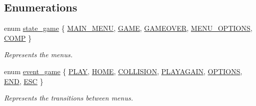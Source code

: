 \subsection*{Enumerations}
\begin{DoxyCompactItemize}
\item 
enum \hyperlink{group___state_machine_ga923762042f3074402fbf32bc96074164}{state\+\_\+game} \{ \newline
\hyperlink{group___state_machine_gga923762042f3074402fbf32bc96074164ac22743f1fc74de09544ecc9bab74a17b}{M\+A\+I\+N\+\_\+\+M\+E\+NU}, 
\hyperlink{group___state_machine_gga923762042f3074402fbf32bc96074164ad50cf309d7568040619ed26ee6835a84}{G\+A\+ME}, 
\hyperlink{group___state_machine_gga923762042f3074402fbf32bc96074164a42495cc178524da331d4681864c72b72}{G\+A\+M\+E\+O\+V\+ER}, 
\hyperlink{group___state_machine_gga923762042f3074402fbf32bc96074164a47392826c80116f57ab66b2132424dbf}{M\+E\+N\+U\+\_\+\+O\+P\+T\+I\+O\+NS}, 
\newline
\hyperlink{group___state_machine_gga923762042f3074402fbf32bc96074164a676fb7a17038f5f755e8acdabecba0ad}{C\+O\+MP}
 \}\begin{DoxyCompactList}\small\item\em Represents the menus. \end{DoxyCompactList}
\item 
enum \hyperlink{group___state_machine_gafd7a2b0489d2d98e27f1311944de7b30}{event\+\_\+game} \{ \newline
\hyperlink{group___state_machine_ggafd7a2b0489d2d98e27f1311944de7b30a0352906d1ea1dfcd663c918f3a86755b}{P\+L\+AY}, 
\hyperlink{group___state_machine_ggafd7a2b0489d2d98e27f1311944de7b30a8f280224da64e98f2d52d50ec43bc197}{H\+O\+ME}, 
\hyperlink{group___state_machine_ggafd7a2b0489d2d98e27f1311944de7b30ad5384d1822c72da119100438c5051831}{C\+O\+L\+L\+I\+S\+I\+ON}, 
\hyperlink{group___state_machine_ggafd7a2b0489d2d98e27f1311944de7b30a8bd68b27c1bc0f0c2b67e020bf079bc8}{P\+L\+A\+Y\+A\+G\+A\+IN}, 
\newline
\hyperlink{group___state_machine_ggafd7a2b0489d2d98e27f1311944de7b30a1b20f1b4adb6ff9778b284fb46f6f99d}{O\+P\+T\+I\+O\+NS}, 
\hyperlink{group___state_machine_ggafd7a2b0489d2d98e27f1311944de7b30adc6f24fd6915a3f2786a1b7045406924}{E\+ND}, 
\hyperlink{group___state_machine_ggafd7a2b0489d2d98e27f1311944de7b30af5297152557c7da396243000ca240e89}{E\+SC}
 \}\begin{DoxyCompactList}\small\item\em Represents the transitions between menus. \end{DoxyCompactList}

\end{DoxyCompactItemize}
